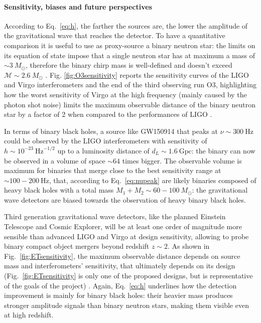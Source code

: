 \documentclass[a4paper,titlepage]{book}     	%
\newcommand{\sun}{\ensuremath{_\odot}}
\newcommand{\msun}{\ensuremath{M\sun}}
\begin{document}
\paragraph{Sensitivity, biases and future perspectives}
According to Eq.\ \ref{eq:h}, the farther the sources are, the lower the amplitude of the gravitational wave that reaches the detector.  To have a quantitative comparison it is useful to use as proxy-source a binary neutron star: the limits on its equation of state impose that a single neutron star has at maximum a mass of $\sim 3~\msun$, therefore the binary chirp mass is well-defined and doesn't exceed $\mathcal{M} \sim 2.6 ~\msun$ \cite{NSreview}. Fig. \ref{fig:O3sensitivity} reports the sensitivity curves of the LIGO and Virgo interferometers and the end of the third observing run O3, highlighting how the worst sensitivity of Virgo at the high frequency (mainly caused by the photon shot noise) limits the maximum observable distance of the binary neutron star by a factor of 2 when compared to the performances of LIGO \cite{GWTC-3}.

In terms of binary black holes, a source like GW150914 that peaks at $\nu \sim 300~\text{Hz}$ could be observed by the LIGO interferometers with sensitivity of $h \sim 10^{-23}~ \text{Hz}^{-1/2}$ up to a luminosity distance of $d_L \sim 1.6~\text{Gpc}$: the binary can now be observed in a volume of space $\sim 64$ times bigger. The observable volume is maximum for binaries that merge close to the best sensitivity range at $\sim 100-200~\text{Hz}$, that, according to Eq.\ \ref{eq:nupeak} are likely binaries composed of heavy black holes with a total mass  $M_1+M_2 \sim 60-100~\msun$: the gravitational wave detectors are biased towards the observation of heavy binary black holes.


Third generation gravitational wave detectors, like the planned Einstein Telescope and Cosmic Explorer, will be at least one order of magnitude more sensible than advanced LIGO and Virgo at design sensitivity, allowing to probe binary compact object mergers beyond redshift $z \sim 2$. As shown in Fig.\ \ref{fig:ETsensitivity}, the maximum observable distance depends on source mass and interferometers' sensitivity, that ultimately depends on its design (Fig.\ \ref{fig:ETsensitivity} is only one of the proposed designs, but is representative of the goals of the project)  \cite{EThorizonsensitivity}. Again, Eq.\ \ref{eq:h} underlines how the detection improvement is mainly for binary black holes: their heavier mass produces stronger amplitude signals than binary neutron stars, making them visible even at high redshift.
\end{document}
